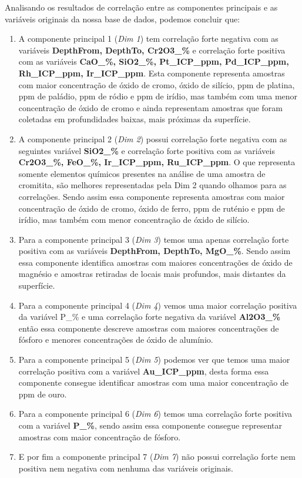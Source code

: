 \documentclass[
]{article}
\begin{document}
Analisando os resultados de correlação entre as componentes principais e as variáveis originais da nossa base de dados, podemos concluir que:

\begin{enumerate}
\def\labelenumi{\arabic{enumi}.}
\item
  A componente principal 1 (\emph{Dim 1}) tem correlação forte negativa com as variáveis \textbf{DepthFrom, DepthTo, Cr2O3\_\%} e correlação forte positiva com as variáveis \textbf{CaO\_\%, SiO2\_\%, Pt\_ICP\_ppm, Pd\_ICP\_ppm, Rh\_ICP\_ppm, Ir\_ICP\_ppm}. Esta componente representa amostras com maior concentração de óxido de cromo, óxido de silício, ppm de platina, ppm de paládio, ppm de ródio e ppm de irídio, mas também com uma menor concentração de óxido de cromo e ainda representam amostras que foram coletadas em profundidades baixas, mais próximas da superfície.
\item
  A componente principal 2 (\emph{Dim 2}) possui correlação forte negativa com as seguintes variável \textbf{SiO2\_\%} e correlação forte positiva com as variáveis \textbf{Cr2O3\_\%, FeO\_\%, Ir\_ICP\_ppm, Ru\_ICP\_ppm}. O que representa somente elementos químicos presentes na análise de uma amostra de cromitita, são melhores representadas pela Dim 2 quando olhamos para as correlações. Sendo assim essa componente representa amostras com maior concentração de óxido de cromo, óxido de ferro, ppm de ruténio e ppm de irídio, mas também com menor concentração de óxido de silício.
\item
  Para a componente principal 3 (\emph{Dim 3}) temos uma apenas correlação forte positiva com as variáveis \textbf{DepthFrom, DepthTo, MgO\_\%}. Sendo assim essa componente identifica amostras com maiores concentrações de óxido de magnésio e amostras retiradas de locais mais profundos, mais distantes da superfície.
\item
  Para a componente principal 4 (\emph{Dim 4}) vemos uma maior correlação positiva da variável P\_\% e uma correlação forte negativa da variável \textbf{Al2O3\_\%} então essa componente descreve amostras com maiores concentrações de fósforo e menores concentrações de óxido de alumínio.
\item
  Para a componente principal 5 (\emph{Dim 5}) podemos ver que temos uma maior correlação positiva com a variável \textbf{Au\_ICP\_ppm}, desta forma essa componente consegue identificar amostras com uma maior concentração de ppm de ouro.
\item
  Para a componente principal 6 (\emph{Dim 6}) temos uma correlação forte positiva com a variável \textbf{P\_\%}, sendo assim essa componente consegue representar amostras com maior concentração de fósforo.
\item
  E por fim a componente principal 7 (\emph{Dim 7}) não possui correlação forte nem positiva nem negativa com nenhuma das variáveis originais.
\end{enumerate}
\end{document}
